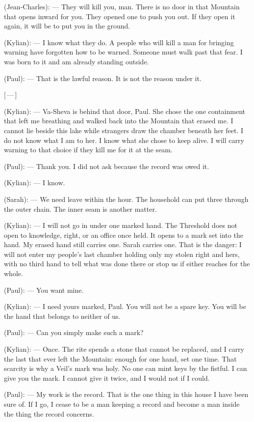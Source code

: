 \begin{room}
(Jean-Charles): --- They will kill you, man. There is no door in that Mountain that opens inward for you. They opened one to push you out. If they open it again, it will be to put you in the ground.

(Kylian): --- I know what they do. A people who will kill a man for bringing warning have forgotten how to be warned. Someone must walk past that fear. I was born to it and am already standing outside.

(Paul): --- That is the lawful reason. It is not the reason under it.

\centerline{[\,---\,]}

(Kylian): --- Va-Sheva is behind that door, Paul. She chose the one containment that left me breathing and walked back into the Mountain that erased me. I cannot lie beside this lake while strangers draw the chamber beneath her feet. I do not know what I am to her. I know what she chose to keep alive. I will carry warning to that choice if they kill me for it at the seam.

(Paul): --- Thank you. I did not ask because the record was owed it.

(Kylian): --- I know.

(Sarah): --- We need leave within the hour. The household can put three through the outer chain. The inner seam is another matter.

(Kylian): --- I will not go in under one marked hand. The Threshold does not open to knowledge, right, or an office once held. It opens to a mark set into the hand. My erased hand still carries one. Sarah carries one. That is the danger: I will not enter my people's last chamber holding only my stolen right and hers, with no third hand to tell what was done there or stop us if either reaches for the whole.

(Paul): --- You want mine.

(Kylian): --- I need yours marked, Paul. You will not be a spare key. You will be the hand that belongs to neither of us.

(Paul): --- Can you simply make such a mark?

(Kylian): --- Once. The rite spends a stone that cannot be replaced, and I carry the last that ever left the Mountain: enough for one hand, set one time. That scarcity is why a Veil's mark was holy. No one can mint keys by the fistful. I can give you the mark. I cannot give it twice, and I would not if I could.

(Paul): --- My work is the record. That is the one thing in this house I have been sure of. If I go, I cease to be a man keeping a record and become a man inside the thing the record concerns.


\end{room}
